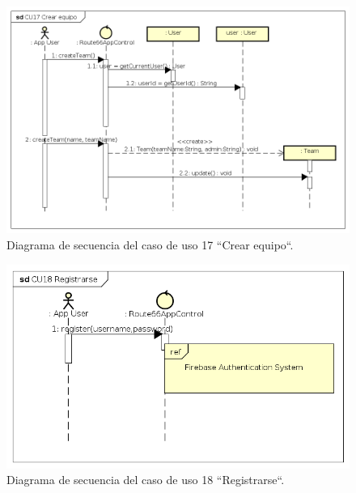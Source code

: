 \documentclass[twoside]{report}
\begin{document}
\begin{figure}[H]
\begin{center}
\includegraphics[width=\textwidth]{images/sequence/CU17}
\caption{Diagrama de secuencia del caso de uso 17 “Crear equipo“.}
\end{center}
\end{figure}


\begin{figure}[H]
\begin{center}
\includegraphics[scale=0.7]{images/sequence/CU18}
\caption{Diagrama de secuencia del caso de uso 18 “Registrarse“.}
\end{center}
\end{figure}
\end{document}
